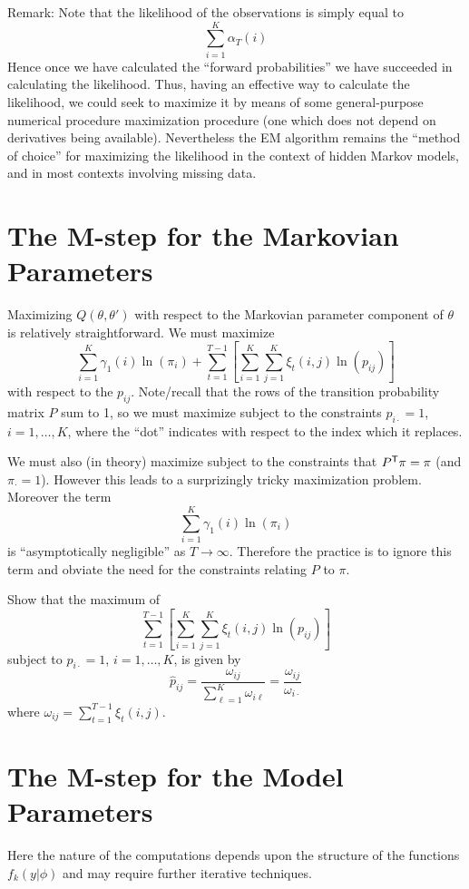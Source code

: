 Remark:  Note that the likelihood of the observations is simply
equal to
\[
\sum_{i=1}^K \alpha_T(i)
\]
Hence once we have calculated the ``forward probabilities'' we have
succeeded in calculating the likelihood.  Thus, having an effective
way to calculate the likelihood, we could seek to maximize it by
means of some general-purpose numerical procedure maximization
procedure (one which does not depend on derivatives being
available).  Nevertheless the EM algorithm remains the ``method of
choice'' for maximizing the likelihood in the context of hidden
Markov models, and in most contexts involving missing data.

\section{The M-step for the Markovian Parameters}

Maximizing $Q(\theta,\theta')$ with respect to the Markovian parameter
component of $\theta$ is relatively straightforward.  We must maximize
\[
\sum_{i=1}^K \gamma_1(i) \ln(\pi_i) +
\sum_{t=1}^{T-1} \left[ \sum_{i=1}^K \sum_{j=1}^K \xi_t(i,j)
   \ln(p_{ij}) \right]
\]
with respect to the $p_{ij}$.  Note/recall that the rows of the
transition probability matrix $P$ sum to 1, so we must maximize
subject to the constraints $p_{i\cdot} = 1$, $i = 1, \ldots, K$,
where the ``dot'' indicates  with respect
to the index which it replaces.

We must also (in theory) maximize subject to the constraints
that $P^{\mbox{\scriptsize \sf T}} \pi = \pi$ (and $\pi_{\cdot} = 1$).  However
this leads to a surprizingly tricky maximization problem.  Moreover
the term
\[
\sum_{i=1}^K \gamma_1(i) \ln(\pi_i)
\]
is ``asymptotically negligible'' as $T \rightarrow \infty$.  Therefore
the practice is to ignore this term and obviate the need for the
constraints relating $P$ to $\pi$.

 Show that the maximum of
\[
\sum_{t=1}^{T-1} \left[ \sum_{i=1}^K \sum_{j=1}^K \xi_t(i,j)
   \ln(p_{ij}) \right]
\]
subject to $p_{i\cdot} = 1$, $i = 1, \ldots, K$, is given by
\[
\hat{p}_{ij} = \frac{\omega_{ij}} {\sum_{\ell=1}^K \omega_{i\ell}}
= \frac{\omega_{ij}}{\omega_{i\cdot}}
\]
where $\omega_{ij} = \sum_{t=1}^{T-1} \xi_t(i,j)$.

\section{The M-step for the Model Parameters}

Here the nature of the computations depends upon the structure
of the functions $f_k(y|\phi)$ and may require further iterative techniques.

